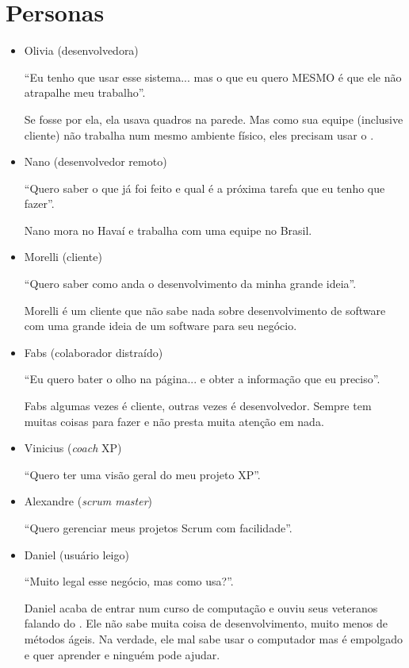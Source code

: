 \section{Personas}
\label{app:personas}

\begin{itemize}
	\item{Olivia (desenvolvedora)
	
	``Eu tenho que usar esse sistema... mas o que eu quero MESMO é que ele não atrapalhe meu
	trabalho''.
	
	Se fosse por ela, ela usava quadros na parede. Mas como sua equipe (inclusive cliente) não trabalha num mesmo ambiente físico, eles precisam usar o \calopsita.}
	\item{Nano (desenvolvedor remoto)
	
	``Quero saber o que já foi feito e qual é a próxima tarefa que eu tenho que fazer''.
	
	Nano mora no Havaí e trabalha com uma equipe no Brasil.}
	\item{Morelli (cliente)
	
	``Quero saber como anda o desenvolvimento da minha grande ideia''. 
	
	Morelli é um cliente que não sabe nada sobre desenvolvimento de software com uma grande ideia de um software para seu negócio.}
	\item{Fabs (colaborador distraído)
	
	``Eu quero bater o olho na página... e obter a informação que eu preciso''.
	
	Fabs algumas vezes é cliente, outras vezes é desenvolvedor. Sempre tem muitas coisas para fazer e não presta muita atenção em nada.}
	\item{Vinicius (\textit{coach} XP)
	
	``Quero ter uma visão geral do meu projeto XP''.}
	\item{Alexandre (\textit{scrum master})
	
	``Quero gerenciar meus projetos Scrum com facilidade''.}
	\item{Daniel (usuário leigo)
	
	``Muito legal esse negócio, mas como usa?''. 
	
	Daniel acaba de entrar num curso de computação e ouviu seus veteranos falando do \calopsita{}. Ele não sabe muita coisa de desenvolvimento, muito menos de métodos ágeis. Na verdade, ele mal sabe usar o computador mas é empolgado e quer aprender e ninguém pode ajudar.}
\end{itemize}
